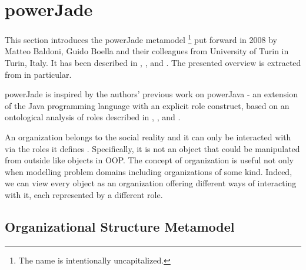 
\section{powerJade}

This section introduces the powerJade metamodel
\footnote{The name is intentionally uncapitalized.}
put forward in 2008 by Matteo Baldoni, Guido Boella and their colleagues from University of Turin in Turin, Italy.
It has been described in \cite{Baldoni08a}, \cite{Baldoni08b}, \cite{Baldoni09} and \cite{Baldoni10}.
The presented overview is extracted from \cite{Hahn07b} in particular.


powerJade is inspired by the authors' previous work on powerJava - an extension of the Java programming language with an explicit role construct, based on an ontological analysis of roles described in \cite{Baldoni05}, \cite{Baldoni06a}, \cite{Baldoni06b} and \cite{Baldoni07}.

An organization belongs to the social reality and it can only be interacted with via the roles it defines \cite{Boella06}.
Specifically, it is not an object that could be manipulated from outside like objects in OOP.
The concept of organization is useful not only when modelling problem domains including organizations of some kind.
Indeed, we can view every object as an organization offering different ways of interacting with it, each represented by a different role.

\subsection*{Organizational Structure Metamodel}

